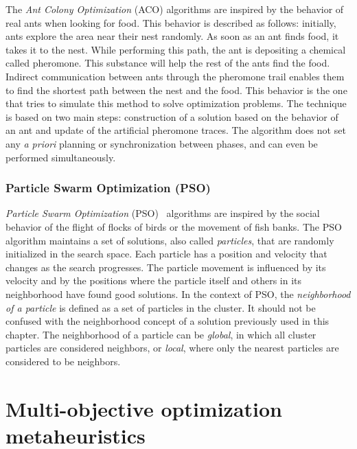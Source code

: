 The \emph{Ant Colony Optimization} (ACO) \cite{dorigo92optimization,dorigo03ant} algorithms are inspired by the behavior of real ants when looking for food. This behavior is described as follows: initially, ants explore the area near their nest randomly. As soon as an ant finds food, it takes it to the nest. While performing this path, the ant is depositing a chemical called pheromone. This substance will help the rest of the ants find the food. Indirect communication between ants through the pheromone trail enables them to find the shortest path between the nest and the food. This behavior is the one that tries to simulate this method to solve optimization problems. The technique is based on two main steps: construction of a solution based on the behavior of an ant and update of the artificial pheromone traces. The algorithm does not set any \emph{a priori} planning or synchronization between phases, and can even be performed simultaneously.

\subsubsection{Particle Swarm Optimization (PSO)}

\emph{Particle Swarm Optimization} (PSO)~\cite{kennedy99small} algorithms are inspired by the social behavior of the flight of flocks of birds or the movement of fish banks. The PSO algorithm maintains a set of solutions, also called \emph{particles}, that are randomly initialized in the search space. Each particle has a position and velocity that changes as the search progresses. The particle movement is influenced by its velocity and by the positions where the particle itself and others in its neighborhood have found good solutions. In the context of PSO, the \emph{neighborhood of a particle}  is defined as a set of particles in the cluster. It should not be confused with the neighborhood concept of a solution previously used in this chapter. The neighborhood of a particle can be \emph{global}, in which all cluster particles are considered neighbors, or \emph{local}, where only the nearest particles are considered to be neighbors.


\section{Multi-objective optimization metaheuristics}
\label{sec:MOOptimizationMetaheuristics}

